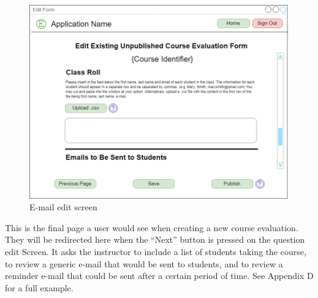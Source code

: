 \documentclass{article}
\begin{document}
\newpage

\begin{center}
\begin{figure}[H]
    \centering
    \caption{E-mail edit screen}
    \includegraphics[width=6.5in]{images/emails_screen.png}
\end{figure}
\end{center}

This is the final page a user would see when creating a new course evaluation. They will be redirected here when the ``Next'' button is pressed on the question edit Screen. It asks the instructor to include a list of students taking the course, to review a generic e-mail that would be sent to students, and to review a reminder e-mail that could be sent after a certain period of time. See Appendix D for a full example.

\newpage
\end{document}
